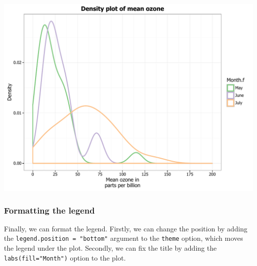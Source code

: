 \documentclass[]{article}
\begin{document}
\begin{center}\includegraphics{0_all_posts_pdf/density_18-1} \end{center}

\subsubsection{Formatting the legend}\label{formatting-the-legend-1}

Finally, we can format the legend. Firstly, we can change the position
by adding the \texttt{legend.position\ =\ "bottom"} argument to the
\texttt{theme} option, which moves the legend under the plot. Secondly,
we can fix the title by adding the \texttt{labs(fill="Month")} option to
the plot.
\end{document}
